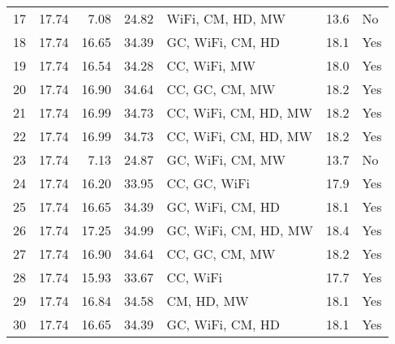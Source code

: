 \begin{tabular}{lrrrlll}
17 &                17.74 &             7.08 &        24.82 &      WiFi, CM, HD, MW &                 13.6 &   No \\
18 &                17.74 &            16.65 &        34.39 &      GC, WiFi, CM, HD &                 18.1 &  Yes \\
19 &                17.74 &            16.54 &        34.28 &          CC, WiFi, MW &                 18.0 &  Yes \\
20 &                17.74 &            16.90 &        34.64 &        CC, GC, CM, MW &                 18.2 &  Yes \\
21 &                17.74 &            16.99 &        34.73 &  CC, WiFi, CM, HD, MW &                 18.2 &  Yes \\
22 &                17.74 &            16.99 &        34.73 &  CC, WiFi, CM, HD, MW &                 18.2 &  Yes \\
23 &                17.74 &             7.13 &        24.87 &      GC, WiFi, CM, MW &                 13.7 &   No \\
24 &                17.74 &            16.20 &        33.95 &          CC, GC, WiFi &                 17.9 &  Yes \\
25 &                17.74 &            16.65 &        34.39 &      GC, WiFi, CM, HD &                 18.1 &  Yes \\
26 &                17.74 &            17.25 &        34.99 &  GC, WiFi, CM, HD, MW &                 18.4 &  Yes \\
27 &                17.74 &            16.90 &        34.64 &        CC, GC, CM, MW &                 18.2 &  Yes \\
28 &                17.74 &            15.93 &        33.67 &              CC, WiFi &                 17.7 &  Yes \\
29 &                17.74 &            16.84 &        34.58 &            CM, HD, MW &                 18.1 &  Yes \\
30 &                17.74 &            16.65 &        34.39 &      GC, WiFi, CM, HD &                 18.1 &  Yes \\
\bottomrule
\end{tabular}
